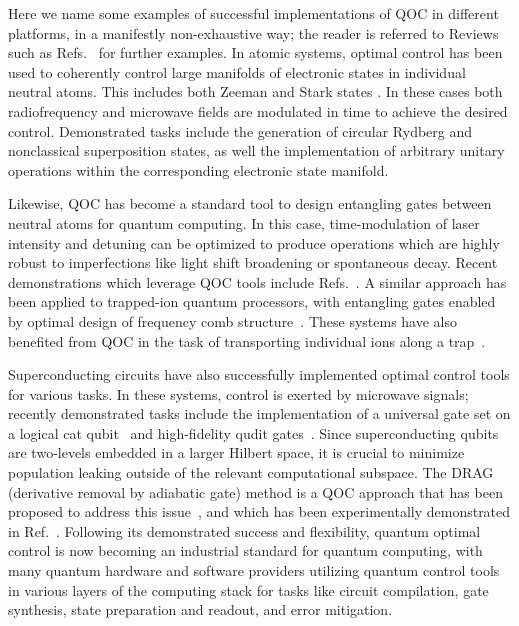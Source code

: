 Here we name some examples of successful implementations of QOC in different platforms, in a manifestly non-exhaustive way; the reader is referred to Reviews such as Refs.~\cite{Glaser2015,Koch2022} for further examples. In atomic systems, optimal control has been used to coherently control large manifolds of electronic states in individual neutral atoms. This includes both Zeeman \cite{smith2013,anderson2015,lysne2020} and Stark states \cite{larrouy2020}. In these cases both radiofrequency and microwave fields are modulated in time to achieve the desired control. Demonstrated tasks include the generation of circular Rydberg and nonclassical superposition states, as well the implementation of arbitrary unitary operations within the corresponding electronic state manifold.

Likewise, QOC has become a standard tool to design entangling gates between neutral atoms for quantum computing. In this case, time-modulation of laser intensity and detuning can be optimized to produce operations which are highly robust to imperfections like light shift broadening or spontaneous decay. Recent demonstrations which leverage QOC tools include Refs.~\cite{omran2019,evered2023,cao2024}. A similar approach has been applied to trapped-ion quantum processors, with entangling gates enabled by optimal design of frequency comb structure~\cite{choi2014}. These systems have also benefited from QOC in the task of transporting individual ions along a trap~\cite{sterk2022}.

Superconducting circuits have also successfully implemented optimal control tools for various tasks. In these systems, control is exerted by microwave signals; recently demonstrated tasks include the implementation of a universal gate set on a logical cat qubit~\cite{heeres2017} and high-fidelity qudit gates~\cite{seifert2023}. Since superconducting qubits are two-levels embedded in a larger Hilbert space, it is crucial to minimize population leaking outside of the relevant computational subspace. The DRAG (derivative removal by adiabatic gate) method is a QOC approach that has been proposed to address this issue~\cite{motzoi2009}, and which has been experimentally demonstrated in Ref.~\cite{werninghaus2021}. Following its demonstrated success and flexibility, quantum optimal control is now becoming an industrial standard for quantum computing, with many quantum hardware and software providers utilizing quantum control tools in various layers of the computing stack for tasks like circuit compilation, gate synthesis, state preparation and readout, and error mitigation.

